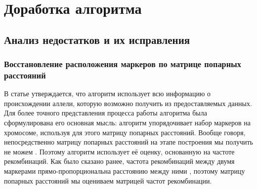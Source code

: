 \documentclass{matmex-diploma-custom}
\begin{document}
\section{Доработка алгоритма}

\subsection{Анализ недостатков и их исправления}

\subsubsection{Восстановление расположения маркеров по матрице
  попарных расстояний}

В статье \cite{sysoev} утверждается, что алгоритм использует всю
информацию о происхождении аллели, которую возможно получить из
предоставляемых данных. Для более точного представления процесса
работы алгоритма была сформулирована его основная мысль: алгоритм
упорядочивает набор маркеров на хромосоме, используя для этого матрицу
попарных расстояний. Вообще говоря, непосредственно матрицу попарных
расстояний на этапе построения мы получить не можем
\cite{bohonak2002ibd}. Поэтому алгоритм использует её оценку,
основанную на частоте рекомбинаций. Как было сказано ранее, частота
рекомбинаций между двумя маркерами прямо-пропорциональна расстоянию
между ними \cite{stam1993construction}, поэтому матрицу попарных
расстояний мы оцениваем матрицей частот рекомбинации.
\end{document}
